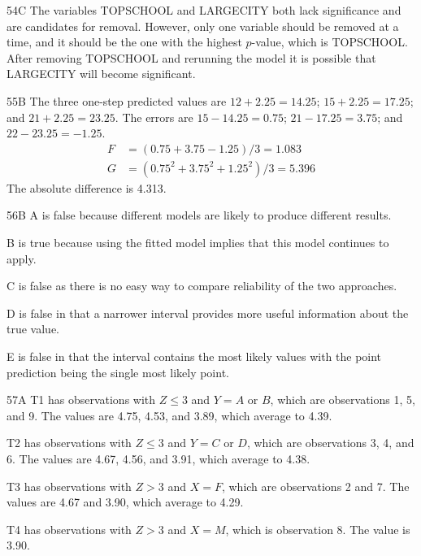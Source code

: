 \begin{solution}{54}{C}
The variables TOPSCHOOL and LARGECITY both lack significance and are candidates for removal. However, only one variable should be removed at a time, and it should be the one with the highest $p$-value, which is TOPSCHOOL. After removing TOPSCHOOL and rerunning the model it is possible that LARGECITY will become significant.
\end{solution}

\begin{solution}{55}{B}
The three one-step predicted values are $12+2.25 = 14.25$; $15+2.25 = 17.25$; and $21+2.25 = 23.25$. The errors are $15 - 14.25 = 0.75$; $21 - 17.25 = 3.75$; and $22 - 23.25 = -1.25$.
\begin{align*}
F &= (0.75 + 3.75 - 1.25)/3 = 1.083 \\
G &= (0.75^2 + 3.75^2 + 1.25^2)/3 = 5.396
\end{align*}
The absolute difference is 4.313.
\end{solution}

\begin{solution}{56}{B}
A is false because different models are likely to produce different results.

B is true because using the fitted model implies that this model continues to apply.

C is false as there is no easy way to compare reliability of the two approaches.

D is false in that a narrower interval provides more useful information about the true value.

E is false in that the interval contains the most likely values with the point prediction being the single most likely point.
\end{solution}

\begin{solution}{57}{A}
T1 has observations with $Z \leqslant 3$ and $Y = A$ or $B$, which are observations 1, 5, and 9. The values are 4.75, 4.53, and 3.89, which average to 4.39.

T2 has observations with $Z \leqslant 3$ and $Y = C$ or $D$, which are observations 3, 4, and 6. The values are 4.67, 4.56, and 3.91, which average to 4.38.

T3 has observations with $Z > 3$ and $X = F$, which are observations 2 and 7. The values are 4.67 and 3.90, which average to 4.29.

T4 has observations with $Z > 3$ and $X = M$, which is observation 8. The value is 3.90.
\end{solution}

